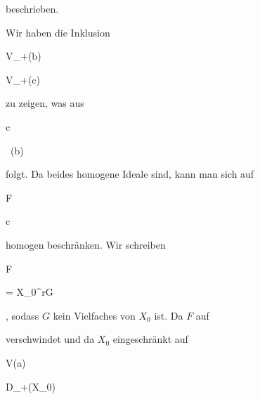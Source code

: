 {{{  }{
}

{    }{
}

{   }{
}

}
{}{}{}
beschrieben.


Wir haben die Inklusion


\mavergleichskette

{\vergleichskette

{ V_+({\mathfrak b})
}

{ \subseteq }{ V_+({\mathfrak c})
}

{  }{
}

{    }{
}

{   }{
}

}
{}{}{}
zu zeigen, was aus


\mavergleichskette

{\vergleichskette

{ {\mathfrak c}
}

{ \subseteq }{  \, ({\mathfrak b})
}

{  }{
}

{    }{
}

{   }{
}

}
{}{}{}
folgt. Da beides homogene Ideale sind, kann man sich auf


\mavergleichskette

{\vergleichskette

{ F
}

{ \in }{ {\mathfrak c}
}

{  }{
}

{    }{
}

{   }{
}

}
{}{}{}
homogen beschränken. Wir schreiben


\mavergleichskette

{\vergleichskette

{ F
}

{ = }{ X_0^rG
}

{  }{
}

{    }{
}

{   }{
}

}
{}{}{,}
sodass $G$ kein Vielfaches von $X_0$ ist. Da $F$ auf

 verschwindet und da $X_0$ eingeschränkt auf


\mavergleichskette

{\vergleichskette

{ V({\mathfrak a})
}

{ \subseteq }{ D_+(X_0)
}

{  }{
}

}}
